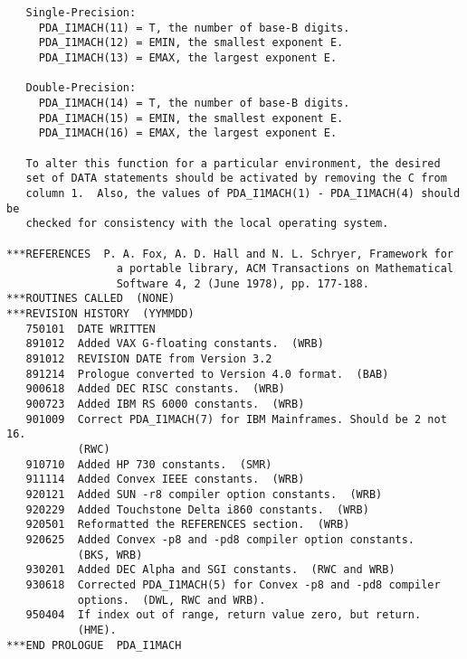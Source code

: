 \begin{verbatim}
   Single-Precision:
     PDA_I1MACH(11) = T, the number of base-B digits.
     PDA_I1MACH(12) = EMIN, the smallest exponent E.
     PDA_I1MACH(13) = EMAX, the largest exponent E.

   Double-Precision:
     PDA_I1MACH(14) = T, the number of base-B digits.
     PDA_I1MACH(15) = EMIN, the smallest exponent E.
     PDA_I1MACH(16) = EMAX, the largest exponent E.

   To alter this function for a particular environment, the desired
   set of DATA statements should be activated by removing the C from
   column 1.  Also, the values of PDA_I1MACH(1) - PDA_I1MACH(4) should be
   checked for consistency with the local operating system.

***REFERENCES  P. A. Fox, A. D. Hall and N. L. Schryer, Framework for
                 a portable library, ACM Transactions on Mathematical
                 Software 4, 2 (June 1978), pp. 177-188.
***ROUTINES CALLED  (NONE)
***REVISION HISTORY  (YYMMDD)
   750101  DATE WRITTEN
   891012  Added VAX G-floating constants.  (WRB)
   891012  REVISION DATE from Version 3.2
   891214  Prologue converted to Version 4.0 format.  (BAB)
   900618  Added DEC RISC constants.  (WRB)
   900723  Added IBM RS 6000 constants.  (WRB)
   901009  Correct PDA_I1MACH(7) for IBM Mainframes. Should be 2 not 16.
           (RWC)
   910710  Added HP 730 constants.  (SMR)
   911114  Added Convex IEEE constants.  (WRB)
   920121  Added SUN -r8 compiler option constants.  (WRB)
   920229  Added Touchstone Delta i860 constants.  (WRB)
   920501  Reformatted the REFERENCES section.  (WRB)
   920625  Added Convex -p8 and -pd8 compiler option constants.
           (BKS, WRB)
   930201  Added DEC Alpha and SGI constants.  (RWC and WRB)
   930618  Corrected PDA_I1MACH(5) for Convex -p8 and -pd8 compiler
           options.  (DWL, RWC and WRB).
   950404  If index out of range, return value zero, but return.
           (HME).
***END PROLOGUE  PDA_I1MACH
\end{verbatim}


